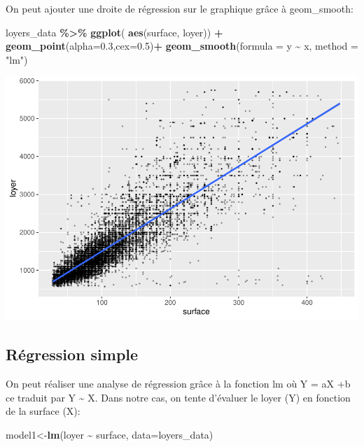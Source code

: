\documentclass[
]{book}
\newenvironment{Shaded}{\begin{snugshade}}{\end{snugshade}}
\newcommand{\AttributeTok}[1]{\textcolor[rgb]{0.13,0.29,0.53}{#1}}
\newcommand{\FloatTok}[1]{\textcolor[rgb]{0.00,0.00,0.81}{#1}}
\newcommand{\FunctionTok}[1]{\textcolor[rgb]{0.13,0.29,0.53}{\textbf{#1}}}
\newcommand{\NormalTok}[1]{#1}
\newcommand{\OtherTok}[1]{\textcolor[rgb]{0.56,0.35,0.01}{#1}}
\newcommand{\SpecialCharTok}[1]{\textcolor[rgb]{0.81,0.36,0.00}{\textbf{#1}}}
\newcommand{\StringTok}[1]{\textcolor[rgb]{0.31,0.60,0.02}{#1}}
\begin{document}
On peut ajouter une droite de régression sur le graphique grâce à
geom\_smooth:

\begin{Shaded}
\begin{Highlighting}[]
\NormalTok{loyers\_data }\SpecialCharTok{\%\textgreater{}\%}
  \FunctionTok{ggplot}\NormalTok{( }\FunctionTok{aes}\NormalTok{(surface, loyer)) }\SpecialCharTok{+}
  \FunctionTok{geom\_point}\NormalTok{(}\AttributeTok{alpha=}\FloatTok{0.3}\NormalTok{,}\AttributeTok{cex=}\FloatTok{0.5}\NormalTok{)}\SpecialCharTok{+}
  \FunctionTok{geom\_smooth}\NormalTok{(}\AttributeTok{formula =}\NormalTok{ y }\SpecialCharTok{\textasciitilde{}}\NormalTok{ x, }\AttributeTok{method =} \StringTok{"lm"}\NormalTok{)}
\end{Highlighting}
\end{Shaded}

\includegraphics{manuel_geo_quanti_files/figure-latex/unnamed-chunk-7-1.pdf}

\hypertarget{ruxe9gression-simple}{%
\subsection{Régression simple}\label{ruxe9gression-simple}}

On peut réaliser une analyse de régression grâce à la fonction lm où Y =
aX +b ce traduit par Y \textasciitilde{} X. Dans notre cas, on tente d'évaluer le loyer
(Y) en fonction de la surface (X):

\begin{Shaded}
\begin{Highlighting}[]
\NormalTok{model1}\OtherTok{\textless{}{-}}\FunctionTok{lm}\NormalTok{(loyer }\SpecialCharTok{\textasciitilde{}}\NormalTok{ surface, }\AttributeTok{data=}\NormalTok{loyers\_data)}
\end{Highlighting}
\end{Shaded}
\end{document}

